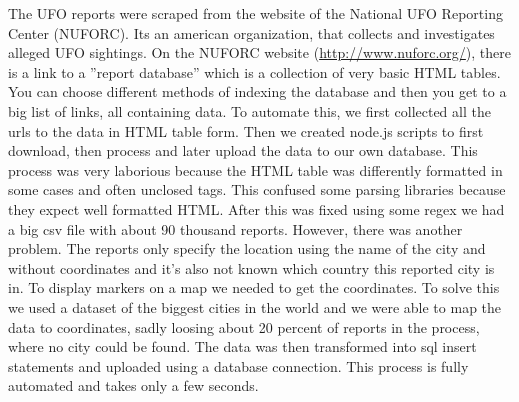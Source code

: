 \documentclass{article}
\begin{document}
The UFO reports were scraped from the website of the National UFO Reporting Center (NUFORC). Its an american organization, that collects and investigates alleged UFO sightings. On the NUFORC website (\url{http://www.nuforc.org/}), there is a link to a ''report database'' which is a collection of very basic HTML tables. You can choose different methods of indexing the database and then you get to a big list of links, all containing data. To automate this, we first collected all the urls to the data in HTML table form. Then we created node.js scripts to first download, then process and later upload the data to our own database. This process was very laborious because the HTML table was differently formatted in some cases and often unclosed tags. This confused some parsing libraries because they expect well formatted HTML. After this was fixed using some regex we had a big csv file with about 90 thousand reports. However, there was another problem. The reports only specify the location using the name of the city and without coordinates and it's also not known which country this reported city is in. To display markers on a map we needed to get the coordinates. To solve this we used a dataset of the biggest cities in the world and we were able to map the data to coordinates, sadly loosing about 20 percent of reports in the process, where no city could be found. The data was then transformed into sql insert statements and uploaded using a database connection. This process is fully automated and takes only a few seconds. 



\end{document}
